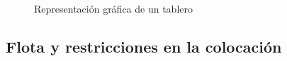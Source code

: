 \begin{frame}

    \begin{figure}
      \caption{Representación gráfica de un tablero}
    \end{figure}
\end{frame}


\subsection{Flota y restricciones en la colocación}

